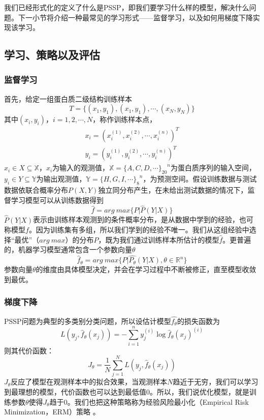 \documentclass[a4paper, tikz]{article}
\begin{document}
我们已经形式化的定义了什么是PSSP，即我们要学习什么样的模型，解决什么问题。下一小节将介绍一种最常见的学习形式——监督学习，以及如何用梯度下降实现该学习。

\subsection{学习、策略以及评估}
\subsubsection{监督学习}
首先，给定一组蛋白质二级结构训练样本
\begin{equation}
	T=\{(x_1,y_1),(x_1,y_1),\cdots,(x_N,y_N)\}
\end{equation}
其中$(x_i,y_i)$，$i=1,2,\cdots,N$，称作训练样本点，
\begin{align}
	x_i=(x_i^{(1)},x_i^{(2)},\cdots,x_i^{(n)})^T\\
	y_i=(y_i^{(1)},y_i^{(2)},\cdots,y_i^{(n)})^T
\end{align}
$x_i\in X\subseteq \mathbb{X}$，$x_i$为输入的观测值，$\mathbb{X}={\{A,C,D,\cdots\}_{20}}^n$为蛋白质序列的输入空间，$y_i\in Y\subseteq \mathbb{Y}$为输出观测值，$\mathbb{Y}={\{H,G,I,\cdots\}_8}^{n}$，为预测空间。假设训练数据与测试数据依联合概率分布$P(X,Y)$独立同分布产生，在未给出测试数据的情况下，监督学习模型可以从训练数据得到
\begin{equation}
	\hat{f}	= arg\ max\{P|\hat{P}(Y|X)\}
\end{equation}
$\hat{P}(Y|X)$表示由训练样本观测到的条件概率分布，是从数据中学到的经验，也可称模型$f$\citep{周志华2016机器学习}。因为训练集有多组，所以我们学到的经验不唯一。我们从这组经验中选择“最优”（$arg\ max$）的分布$P$，既为我们通过训练样本所估计的模型$\hat{f}$。更普遍的，机器学习模型通常包含一个参数向量$\theta$
\begin{equation}
	{\hat{f}}_{\theta}=arg\ max\{P|\hat{P_{\theta}}(Y|X),\theta\in {\mathbb{R}}^n\}
\end{equation}
参数向量$\theta$的维度由具体模型决定，并会在学习过程中不断被修正，直至模型收敛到最优。

\subsubsection{梯度下降}
PSSP问题为典型的多类别分类问题，所以设估计模型$\hat{f_{\theta}}$的损失函数为
\begin{equation}	
	L(y_j, \hat{f}_{\theta}(x_j))=-\sum_{i=1}^{n}y_j^{(i)}\log \hat{f}_{\theta}(x_j)^{(i)}
\end{equation}
则其代价函数：
\begin{equation}
	J_{\theta}=\frac{1}{N}\sum_{j=1}^{N}L(y_j, \hat{f}_{\theta}(x_j))	
\end{equation}
$J_{\theta}$反应了模型在观测样本中的拟合效果，当观测样本$N$趋近于无穷，我们可以学习到最理想的模型，代价函数也可以达到最低值0。所以，我们说优化模型，就是训练参数$\theta$使得$J_{\theta}$趋于0。我们也把这种策略称为经验风险最小化（Empirical Risk Minimization，ERM）策略\citep{李航2012统计学习方法} 。
\end{document}
